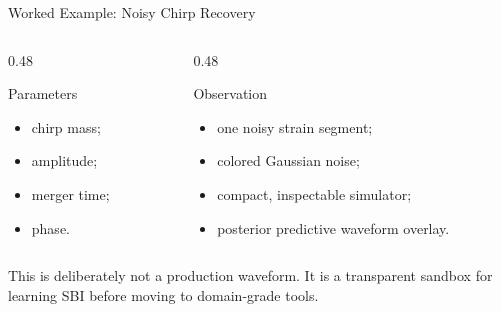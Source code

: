 \documentclass[aspectratio=169,11pt]{beamer}
\newcommand{\tightlist}{\setlength{\itemsep}{0.35em}}
\begin{document}
\begin{frame}{Worked Example: Noisy Chirp Recovery}
  \begin{columns}[T,onlytextwidth]
    \begin{column}{0.48\textwidth}
      \begin{block}{Parameters}
        \begin{itemize}\tightlist
          \item chirp mass;
          \item amplitude;
          \item merger time;
          \item phase.
        \end{itemize}
      \end{block}
    \end{column}
    \begin{column}{0.48\textwidth}
      \begin{block}{Observation}
        \begin{itemize}\tightlist
          \item one noisy strain segment;
          \item colored Gaussian noise;
          \item compact, inspectable simulator;
          \item posterior predictive waveform overlay.
        \end{itemize}
      \end{block}
    \end{column}
  \end{columns}

  \vspace{0.35cm}
  \small This is deliberately not a production waveform. It is a transparent
  sandbox for learning SBI before moving to domain-grade tools.
\end{frame}
\end{document}
